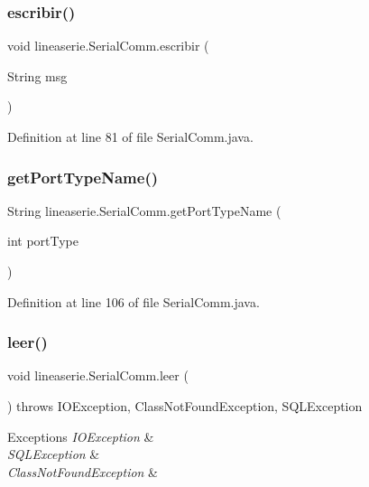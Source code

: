 \subsubsection{\texorpdfstring{escribir()}{escribir()}}
{\footnotesize\ttfamily void lineaserie.\+Serial\+Comm.\+escribir (\begin{DoxyParamCaption}\item[{String}]{msg }\end{DoxyParamCaption})}



Definition at line 81 of file Serial\+Comm.\+java.

\mbox{\label{classlineaserie_1_1_serial_comm_ae0ae445e9464e90c1f4ebe3e943d0788}} 
\subsubsection{\texorpdfstring{get\+Port\+Type\+Name()}{getPortTypeName()}}
{\footnotesize\ttfamily String lineaserie.\+Serial\+Comm.\+get\+Port\+Type\+Name (\begin{DoxyParamCaption}\item[{int}]{port\+Type }\end{DoxyParamCaption})}



Definition at line 106 of file Serial\+Comm.\+java.

\mbox{\label{classlineaserie_1_1_serial_comm_a9e5dc899a435cb7bbd14c50af1e69a9e}} 
\subsubsection{\texorpdfstring{leer()}{leer()}}
{\footnotesize\ttfamily void lineaserie.\+Serial\+Comm.\+leer (\begin{DoxyParamCaption}{ }\end{DoxyParamCaption}) throws I\+O\+Exception, Class\+Not\+Found\+Exception, S\+Q\+L\+Exception}


\begin{DoxyExceptions}{Exceptions}
{\em I\+O\+Exception} & ~\newline
\\
\hline
{\em S\+Q\+L\+Exception} & \\
\hline
{\em Class\+Not\+Found\+Exception} & \\
\hline
\end{DoxyExceptions}



